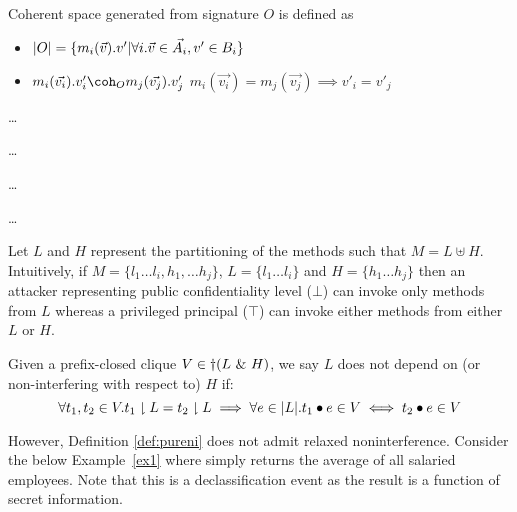 \documentclass[acmsmall,screen,review, nonacm]{acmart}
\begin{document}
\begin{definition}
  Coherent space generated from signature $O$ is defined as
  \begin{itemize}
  \item $|O| = \{ m_i(\vec{v}).v' | \forall i. \vec{v} \in \vec{A_i}, v' \in B_i  \}$
    \item $ m_i(\vec{v_i}).v'_i \coherent{O} m_j(\vec{v_j}).v'_j$ \isdef $m_i(\vec{v_i}) = m_j(\vec{v_j}) \implies v'_i = v'_j $
  \end{itemize}
  
\end{definition}


\begin{definition}
\dots
\end{definition}

\begin{definition}
\dots

\end{definition}


\begin{definition}[Trace]
\dots

\end{definition}


\begin{definition}[Projection]
\dots

\end{definition}


Let $L$ and $H$ represent the partitioning of the methods such that $M = L \uplus H$. Intuitively, if $M = \{ l_1 \dots l_i, h_1, \dots h_j \}$,  $L = \{ l_1 \dots l_i\}$ and $H = \{ h_1 \dots h_j \}$ then an attacker representing public confidentiality level ($\bot$) can  invoke only methods from $L$ whereas a privileged principal ($\top$) can invoke either methods from either $L$ or $H$. 


\begin{definition}\label{def:pureni}
  Given a prefix-closed clique $V \in \dagger(L ~\&~ H)$, we say $L$ does not depend on (or non-interfering with respect to) $H$ if:
  \[
  \forall t_1, t_2 \in V. t_1 \downharpoonright L =  t_2 \downharpoonright L \implies \forall e \in |L|. t_1  \bullet e \in V \iff t_2 \bullet e \in V
  \]
\end{definition}

However, Definition \ref{def:pureni} does not  admit  relaxed noninterference.
Consider the below Example~\ref{ex1} where   simply returns the average of all salaried employees. Note that this is a declassification event as the result is a function of secret information.
\end{document}
